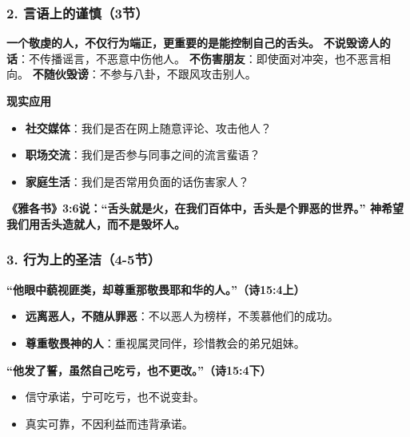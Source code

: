 \documentclass[a4paper, 12pt]{article}
\begin{document}
\subsubsection*{2. 言语上的谨慎（3节）}

\textbf{一个敬虔的人，不仅行为端正，更重要的是能控制自己的舌头。  }
\textbf{不说毁谤人的话}：不传播谣言，不恶意中伤他人。  
\textbf{不伤害朋友}：即使面对冲突，也不恶言相向。  
\textbf{不随伙毁谤}：不参与八卦，不跟风攻击别人。  


\textbf{现实应用} 

\begin{itemize}
    \item \textbf{社交媒体}：我们是否在网上随意评论、攻击他人？  

    \item \textbf{职场交流}：我们是否参与同事之间的流言蜚语？  

    \item \textbf{家庭生活}：我们是否常用负面的话伤害家人？  

\end{itemize}

\textbf{《雅各书》3:6说：“舌头就是火，在我们百体中，舌头是个罪恶的世界。” 神希望我们用舌头造就人，而不是毁坏人。}



\subsubsection*{3. 行为上的圣洁（4-5节）}
\hspace{0.4cm}\textbf{“他眼中藐视匪类，却尊重那敬畏耶和华的人。”（诗15:4上）}  

\begin{itemize}
    \item \textbf{远离恶人，不随从罪恶}：不以恶人为榜样，不羡慕他们的成功。  

    \item \textbf{尊重敬畏神的人}：重视属灵同伴，珍惜教会的弟兄姐妹。  

\end{itemize}

\textbf{“他发了誓，虽然自己吃亏，也不更改。”（诗15:4下）}

\begin{itemize}
    \item 信守承诺，宁可吃亏，也不说变卦。  

    \item 真实可靠，不因利益而违背承诺。  

\end{itemize}
\end{document}
